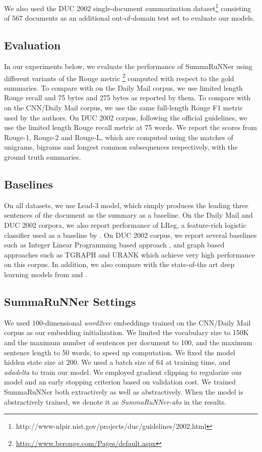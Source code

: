 \documentclass[letterpaper]{article}
\begin{document}
We also used the DUC 2002 single-document summarization dataset\footnote{http://www-nlpir.nist.gov/projects/duc/guidelines/2002.html} consisting of 567 documents as an additional out-of-domain test set to evaluate our models.


\subsection{Evaluation} 
In our experiments below, we evaluate the performance of SummaRuNNer using different variants of the Rouge metric \footnote{{\small\url{ http://www.berouge.com/Pages/default.aspx}}} computed with respect to the gold summaries. To compare with \cite{jianpeng} on the Daily Mail corpus, we use limited length Rouge recall and 75 bytes and 275 bytes as reported by them. To compare with \cite{nallapati_conll} on the CNN/Daily Mail corpus, we use the same full-length Rouge F1 metric used by the authors. On DUC 2002 corpus, following the official guidelines, we use the limited length Rouge recall metric at  75 words. We report the scores from Rouge-1, Rouge-2 and Rouge-L, which are computed using the matches of unigrams, bigrams and longest common subsequences respectively, with the ground truth summaries.

\subsection{Baselines} 
On all datasets, we use Lead-3 model, which simply produces the leading three sentences of the document as the summary as a baseline. On the Daily Mail and DUC 2002 corpora, we also report performance of LReg, a feature-rich logistic classifier used as a baseline by \cite{jianpeng}. On DUC 2002 corpus, we report several baselines such as Integer Linear Programming based approach \cite{ilp}, and graph based approaches such as TGRAPH \cite{tgraph} and URANK \cite{urank} which achieve very high performance on this corpus. In addition, we also compare with the state-of-the art deep learning models from \cite{jianpeng} and \cite{nallapati_conll}.









\subsection{SummaRuNNer Settings} We used 100-dimensional {\it word2vec} \cite{mikolovWord2vec:13} embeddings trained on the CNN/Daily Mail corpus as our embedding initialization. We limited the vocabulary size to 150K and the maximum number of sentences per document to 100, and the maximum sentence length to 50 words, to speed up computation. We fixed the model hidden state size at 200. We used a batch size of 64 at training time, and {\it adadelta} \cite{adadelta} to train our model. We employed gradient clipping to regularize our model and an early stopping criterion based on validation cost. We trained SummaRuNNer both extractively as well as abstractively. When the model is abstractively trained, we denote it as {\it SummaRuNNer-abs} in the results.
\end{document}
